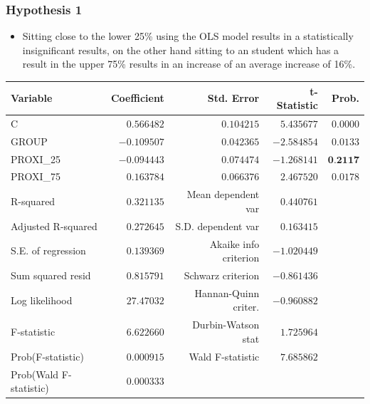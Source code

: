\documentclass{beamer} %
\theoremstyle{definition}
\begin{document}
	
	
	
	\begin{frame}
		\frametitle{Hypothesis 1}
		\centering
		\begin{itemize}
			\item Sitting close to the lower 25\% using the OLS model results in a statistically insignificant results, on the other hand sitting to an student which has a result in the upper 75\% results in an increase of an average increase of 16\%.
		\end{itemize}
	
	\begin{table}[!htbp]
		\centering
		\tiny
		\begin{tabular}{lrrrr}
			\hline
			Variable & Coefficient & Std. Error & t-Statistic & Prob. \\
			\hline
			C & $0.566482$  & $0.104215$  & $5.435677$  & $0.0000$ \\
			GROUP & $-0.109507$ & $0.042365$  & $-2.584854$ & $0.0133$ \\
			PROXI\_25 & $-0.094443$ & $0.074474$  & $-1.268141$ & $\textbf{0.2117}$ \\
			PROXI\_75 & $0.163784$  & $0.066376$  & $2.467520$  & $0.0178$ \\
			\hline
			R-squared & $0.321135$ & Mean dependent var & $0.440761$ &  \\
			Adjusted R-squared & $0.272645$ & S.D. dependent var & $0.163415$ &  \\
			S.E. of regression & $0.139369$ & Akaike info criterion & $-1.020449$ &  \\
			Sum squared resid & $0.815791$ & Schwarz criterion & $-0.861436$ &  \\
			Log likelihood & $27.47032$ & Hannan-Quinn criter. & $-0.960882$ &  \\
			F-statistic & $6.622660$ & Durbin-Watson stat & $1.725964$ &  \\
			Prob(F-statistic) & $0.000915$ & Wald F-statistic & $7.685862$ &  \\
			Prob(Wald F-statistic) & $0.000333$ &  &  &  \\
			\hline
		\end{tabular}
	\end{table}
	\end{frame}
	
\end{document}

